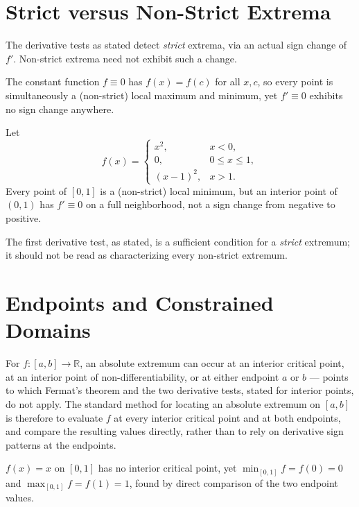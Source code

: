 \documentclass{essay}
\begin{document}
\section{Strict versus Non-Strict Extrema}

The derivative tests as stated detect \emph{strict} extrema, via an actual
sign change of \(f'\). Non-strict extrema need not exhibit such a change.

\begin{example}
  The constant function \(f\equiv0\) has \(f(x)=f(c)\) for all \(x,c\), so
  every point is simultaneously a (non-strict) local maximum and minimum, yet
  \(f'\equiv0\) exhibits no sign change anywhere.
\end{example}

\begin{example}
  Let
  \[
    f(x)=
    \begin{cases} x^{2}, & x<0,\\ 0, & 0\leq x\leq1,\\ (x-1)^{2},& x>1.
    \end{cases}
  \]
  Every point of \([0,1]\) is a (non-strict) local minimum, but an interior
  point of \((0,1)\) has \(f'\equiv0\) on a full neighborhood, not a sign
  change from negative to positive.
\end{example}

The first derivative test, as stated, is a sufficient condition for a
\emph{strict} extremum; it should not be read as characterizing every
non-strict extremum.

\section{Endpoints and Constrained Domains}

For \(f:[a,b]\to\mathbb{R}\), an absolute extremum can occur at an interior
critical point, at an interior point of non-differentiability, or at either
endpoint \(a\) or \(b\) --- points to which Fermat's theorem and the two
derivative tests, stated for interior points, do not apply. The standard
method for locating an absolute extremum on \([a,b]\) is therefore to
evaluate \(f\) at every interior critical point and at both endpoints, and
compare the resulting values directly, rather than to rely on derivative
sign patterns at the endpoints.

\begin{example}
  \(f(x)=x\) on \([0,1]\) has no interior critical point, yet
  \(\min_{[0,1]}f=f(0)=0\) and \(\max_{[0,1]}f=f(1)=1\), found by direct
  comparison of the two endpoint values.
\end{example}
\end{document}
